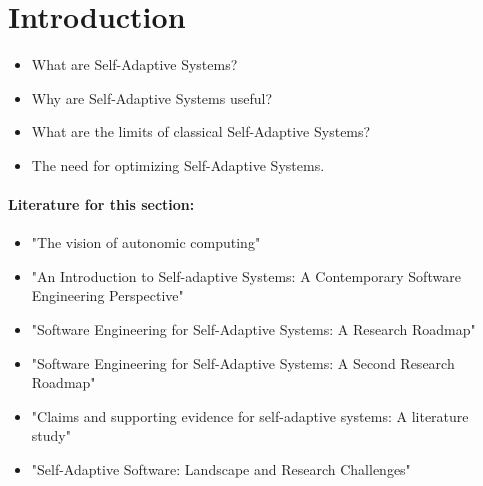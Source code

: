 \newpage
\section{Introduction}
\label{ch:Introduction}

\begin{itemize}
    \item What are Self-Adaptive Systems?
    \item Why are Self-Adaptive Systems useful?
    \item What are the limits of classical Self-Adaptive Systems?
    \item The need for optimizing Self-Adaptive Systems.
\end{itemize}

\paragraph*{Literature for this section:} \begin{itemize}
    \item "The vision of autonomic computing" \cite{1160055}
    \item "An Introduction to Self-adaptive Systems: A Contemporary Software Engineering Perspective" \cite{sasIntroduction}
    \item "Software Engineering for Self-Adaptive Systems: A Research Roadmap" \cite{Cheng2009}
    \item "Software Engineering for Self-Adaptive Systems: A Second Research Roadmap" \cite{deLemos2013}
    \item "Claims and supporting evidence for self-adaptive systems: A literature study" \cite{6224395}
    \item "Self-Adaptive Software: Landscape and Research Challenges" \cite{10.1145/1516533.1516538}
\end{itemize}